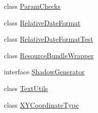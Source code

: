 \begin{DoxyCompactItemize}
class \mbox{\hyperlink{classorg_1_1jfree_1_1chart_1_1util_1_1_param_checks}{Param\+Checks}}
\item 
class \mbox{\hyperlink{classorg_1_1jfree_1_1chart_1_1util_1_1_relative_date_format}{Relative\+Date\+Format}}
\item 
class \mbox{\hyperlink{classorg_1_1jfree_1_1chart_1_1util_1_1_relative_date_format_test}{Relative\+Date\+Format\+Test}}
\item 
class \mbox{\hyperlink{classorg_1_1jfree_1_1chart_1_1util_1_1_resource_bundle_wrapper}{Resource\+Bundle\+Wrapper}}
\item 
interface \mbox{\hyperlink{interfaceorg_1_1jfree_1_1chart_1_1util_1_1_shadow_generator}{Shadow\+Generator}}
\item 
class \mbox{\hyperlink{classorg_1_1jfree_1_1chart_1_1util_1_1_text_utils}{Text\+Utils}}
\item 
class \mbox{\hyperlink{classorg_1_1jfree_1_1chart_1_1util_1_1_x_y_coordinate_type}{X\+Y\+Coordinate\+Type}}
\end{DoxyCompactItemize}
